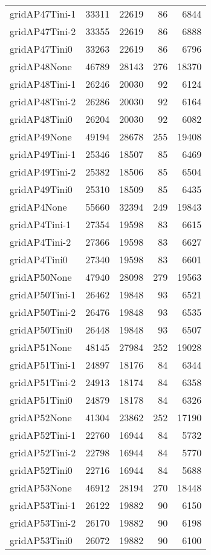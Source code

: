 \begin{longtable}{lrrrr}
gridAP47Tini-1 & 33311 & 22619 & 86 & 6844 \\
gridAP47Tini-2 & 33355 & 22619 & 86 & 6888 \\
gridAP47Tini0 & 33263 & 22619 & 86 & 6796 \\
gridAP48None & 46789 & 28143 & 276 & 18370 \\
gridAP48Tini-1 & 26246 & 20030 & 92 & 6124 \\
gridAP48Tini-2 & 26286 & 20030 & 92 & 6164 \\
gridAP48Tini0 & 26204 & 20030 & 92 & 6082 \\
gridAP49None & 49194 & 28678 & 255 & 19408 \\
gridAP49Tini-1 & 25346 & 18507 & 85 & 6469 \\
gridAP49Tini-2 & 25382 & 18506 & 85 & 6504 \\
gridAP49Tini0 & 25310 & 18509 & 85 & 6435 \\
gridAP4None & 55660 & 32394 & 249 & 19843 \\
gridAP4Tini-1 & 27354 & 19598 & 83 & 6615 \\
gridAP4Tini-2 & 27366 & 19598 & 83 & 6627 \\
gridAP4Tini0 & 27340 & 19598 & 83 & 6601 \\
gridAP50None & 47940 & 28098 & 279 & 19563 \\
gridAP50Tini-1 & 26462 & 19848 & 93 & 6521 \\
gridAP50Tini-2 & 26476 & 19848 & 93 & 6535 \\
gridAP50Tini0 & 26448 & 19848 & 93 & 6507 \\
gridAP51None & 48145 & 27984 & 252 & 19028 \\
gridAP51Tini-1 & 24897 & 18176 & 84 & 6344 \\
gridAP51Tini-2 & 24913 & 18174 & 84 & 6358 \\
gridAP51Tini0 & 24879 & 18178 & 84 & 6326 \\
gridAP52None & 41304 & 23862 & 252 & 17190 \\
gridAP52Tini-1 & 22760 & 16944 & 84 & 5732 \\
gridAP52Tini-2 & 22798 & 16944 & 84 & 5770 \\
gridAP52Tini0 & 22716 & 16944 & 84 & 5688 \\
gridAP53None & 46912 & 28194 & 270 & 18448 \\
gridAP53Tini-1 & 26122 & 19882 & 90 & 6150 \\
gridAP53Tini-2 & 26170 & 19882 & 90 & 6198 \\
gridAP53Tini0 & 26072 & 19882 & 90 & 6100 \\

\end{longtable}
